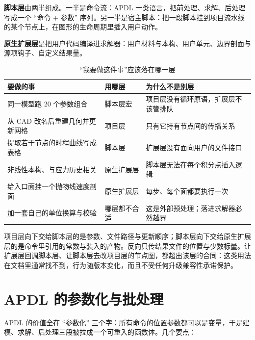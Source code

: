 \documentclass[12pt,a4paper,fontset=fandol]{ctexbook}
\begin{document}
\textbf{脚本层}由两半组成。一半是命令流：APDL 一类语言，把前处理、求解、后处理写成一个 ``命令 + 参数'' 序列。另一半是宿主脚本：把一段脚本挂到项目流水线的某个节点上，在图形的生命周期里插入用户动作。

\textbf{原生扩展层}是把用户代码编译进求解器：用户材料与本构、用户单元、边界剖面与源项钩子、自定义结果量。

\begin{table}[htbp]
\centering
\caption{``我要做这件事''应该落在哪一层}
\label{tab:ch02-layer-choice}
\begin{tabular}{>{\raggedright\arraybackslash}p{}
                >{\raggedright\arraybackslash}p{}
                >{\raggedright\arraybackslash}p{}}
\toprule
\textbf{要做的事} & \textbf{用哪层} & \textbf{为什么不是别层} \\
\midrule
同一模型跑 20 个参数组合 & 脚本层宏 & 项目层没有循环原语，扩展层不该管排队 \\
从 CAD 改名后重建几何并更新网格 & 项目层 & 只有它持有节点间的传播关系 \\
提取若干节点的时程曲线写成表格 & 脚本层 & 扩展层没有面向用户的文件接口 \\
非线性本构、与应力历史相关 & 原生扩展层 & 脚本层无法在每个积分点插入逻辑 \\
给入口面挂一个抛物线速度剖面 & 原生扩展层 & 每步、每个面都要执行一次 \\
加一套自己的单位换算与校验 & 哪层都不合适 & 这是外部预处理；落进求解器必然越界 \\
\bottomrule
\end{tabular}
\end{table}

\begin{guideline}[title={三层之间只有向下的交接是稳定的}]
项目层向下交给脚本层的是参数、文件路径与更新顺序；脚本层向下交给原生扩展层的是命令里引用的常数与装入的产物。反向只传结果文件的位置与少数标量。让扩展层回调脚本层、让脚本层去改项目层的节点图，都超出该层的合同：这类用法在文档里通常找不到，行为随版本变化，而且不受任何升级兼容性承诺保护。
\end{guideline}

\section{APDL 的参数化与批处理}
\label{sec:ch02-apdl}

APDL 的价值全在 ``参数化'' 三个字：所有命令的位置参数都可以是变量，于是建模、求解、后处理三段被拉成一个可重入的函数体。几个要点：
\end{document}
